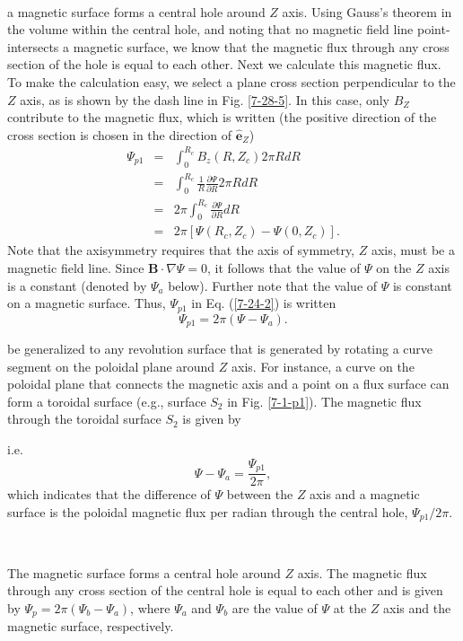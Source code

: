 \documentclass{llncs}
\begin{document}
\

a magnetic surface forms a central hole around $Z$ axis. Using Gauss's
theorem in the volume within the central hole, and noting that no magnetic
field line point-intersects a magnetic surface, we know that the magnetic flux
through any cross section of the hole is equal to each other. Next we
calculate this magnetic flux. To make the calculation easy, we select a plane
cross section perpendicular to the $Z$ axis, as is shown by the dash line in
Fig. \ref{7-28-5}. In this case, only $B_Z$ contribute to the magnetic flux,
which is written (the positive direction of the cross section is chosen in the
direction of $\hat{\mathbf{e}}_Z$)
\begin{eqnarray*}
  \Psi_{p 1} & = & \int_0^{R_c} B_z (R, Z_c) 2 \pi R d R\\
  & = & \int_0^{R_c} \frac{1}{R}  \frac{\partial \Psi}{\partial R} 2 \pi R d
  R\\
  & = & 2 \pi \int_0^{R_c} \frac{\partial \Psi}{\partial R} d R\\
  & = & 2 \pi [\Psi (R_c, Z_c) - \Psi (0, Z_c)] .
\end{eqnarray*}
Note that the axisymmetry requires that the axis of symmetry, $Z$ axis, must
be a magnetic field line. Since $\mathbf{B} \cdot \nabla \Psi = 0$, it follows
that the value of $\Psi$ on the $Z$ axis is a constant (denoted by $\Psi_a$
below). Further note that the value of $\Psi$ is constant on a magnetic
surface. Thus, $\Psi_{p 1}$ in Eq. (\ref{7-24-2}) is written
\begin{equation}
  \label{12-30-1} \Psi_{p 1} = 2 \pi (\Psi - \Psi_a) .
\end{equation}


be generalized to any revolution surface that is generated by rotating a curve
segment on the poloidal plane around $Z$ axis. For instance, a curve on the
poloidal plane that connects the magnetic axis and a point on a flux surface
can form a toroidal surface (e.g., surface $S_2$ in Fig. \ref{7-1-p1}). The
magnetic flux through the toroidal surface $S_2$ is given by

i.e.
\begin{equation}
  \Psi - \Psi_a = \frac{\Psi_{p 1}}{2 \pi},
\end{equation}
which indicates that the difference of $\Psi$ between the $Z$ axis and a
magnetic surface is the poloidal magnetic flux per radian through the central
hole, $\Psi_{p 1} / 2 \pi$.

\

The magnetic surface forms a central hole around $Z$ axis. The magnetic flux
through any cross section of the central hole is equal to each other and is
given by $\Psi_p = 2 \pi (\Psi_b - \Psi_a)$, where $\Psi_a$ and $\Psi_b$ are
the value of $\Psi$ at the $Z$ axis and the magnetic surface, respectively.
\end{document}
